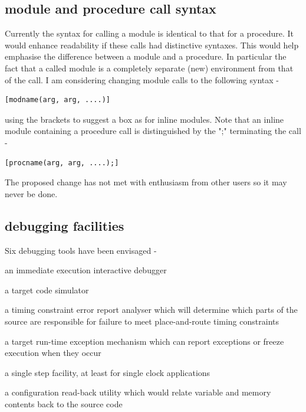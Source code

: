         \subsection{module and procedure call syntax}

            Currently the syntax for calling a module is identical to that for a
            procedure. It would enhance readability if these calls had
            distinctive syntaxes. This would help emphasise the difference
            between a module and a procedure. In particular the fact that a
            called module is a completely separate (new) environment from that
            of the call. I am considering changing module calls to the following
            syntax -
            \begin{lstlisting}[gobble=12, language=threepl]
               [modname(arg, arg, ....)]
            \end{lstlisting}
            using the brackets to suggest a box as for inline modules.
            Note that an inline module containing a procedure call is
            distinguished by the ";" terminating the call -
            \begin{lstlisting}[gobble=12, language=threepl]
               [procname(arg, arg, ....);]
            \end{lstlisting}
            The proposed change has not met with enthusiasm from other users
            so it may never be done.

        \subsection{debugging facilities}

            Six debugging tools have been envisaged -
            \blist
            \item   an immediate execution interactive debugger
            \item   a target code simulator
            \item   a timing constraint error report analyser which will
                    determine which parts of the source are responsible for
                    failure to meet place-and-route timing constraints
            \item   a target run-time exception mechanism which can report
                    exceptions or freeze execution when they occur
            \item   a single step facility, at least for single clock
                    applications
            \item   a configuration read-back utility which would relate
                    variable and memory contents back to the source code
            \blend

